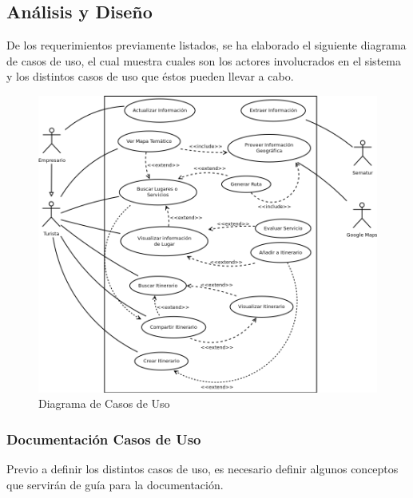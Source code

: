\documentclass[12pt]{article}
\begin{document}
\subsection{Análisis y Diseño	} 
De los requerimientos previamente listados, se ha elaborado el siguiente diagrama de casos de uso, el cual muestra cuales son los actores involucrados en el sistema y los distintos casos de uso que éstos pueden llevar a cabo.
\begin{center}\begin{figure}[htp]
\centering
\includegraphics[scale=0.4]{Diagrama1.png}
\caption{Diagrama de Casos de Uso}
\label{}
\end{figure} \end{center} 
\newpage
\subsubsection{Documentación Casos de Uso}
Previo a definir los distintos casos de uso, es necesario definir algunos conceptos que servirán de guía para la documentación.
\end{document}
